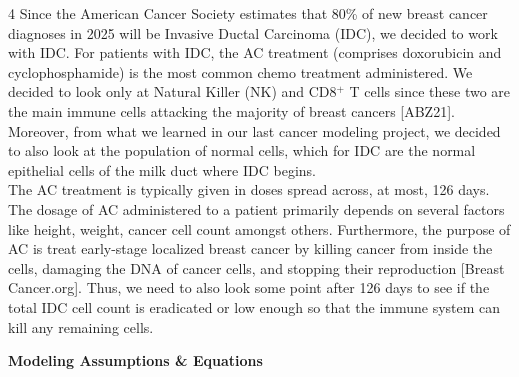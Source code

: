 \documentclass[a0]{4by3}
\newcommand{\NumColumns}{4}
\begin{document}
\begin{minipage}{\linewidth + 2\fboxsep}
\begin{multicols*}{\NumColumns}
       Since the American Cancer Society estimates that 80\% of new breast cancer diagnoses in 2025 will be Invasive Ductal Carcinoma (IDC), we decided to work with IDC.
      For patients with IDC, the AC treatment (comprises doxorubicin and cyclophosphamide) is the most common chemo treatment administered.
      We decided to look only at Natural Killer (NK) and  CD8$^+$ T cells since these two are the main immune cells attacking the majority of breast cancers [ABZ21].
      Moreover, from what we learned in our last cancer modeling project, we decided to also look at the population of normal cells, which for IDC are the normal epithelial cells of the milk duct where IDC begins.\\
      
The AC treatment is typically given in doses spread across, at most, 126 days.
The dosage of AC administered to a patient primarily depends on several factors like height, weight, cancer cell count amongst others.
Furthermore, the purpose of AC is treat early-stage localized breast cancer by killing cancer from inside the cells, damaging the DNA of cancer cells, and stopping their reproduction [Breast Cancer.org].
Thus, we need to also look some point after 126 days to see if the total IDC cell count is eradicated or low enough so that the immune system can kill any remaining cells.

            \columnbreak
            
\vspace{1mm}

\begin{center}
        \LARGE{\textbf{Modeling Assumptions \& Equations}}
\end{center}
\large
\vspace{-2mm}


\end{multicols*}
\end{minipage}
\end{document}
